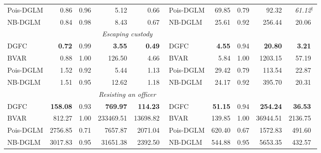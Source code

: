 \begin{tabular}{@{}lrrrr@{\qquad}lrrrr@{}}
Pois-DGLM & 0.86 & 0.96 & 5.12 & 0.66$^{\phantom{\dagger}}$ & Pois-DGLM & 69.85 & 0.79 & 92.32 & \textit{61.12}$^{\dagger}$ \\
NB-DGLM   & 0.84 & 0.98 & 8.43 & 0.67$^{\phantom{\dagger}}$ & NB-DGLM   & 25.61 & 0.92 & 256.44 & 20.06$^{\phantom{\dagger}}$ \\
\addlinespace
\multicolumn{5}{c}{\textit{Manslaughter}} & \multicolumn{5}{c}{\textit{Escaping custody}} \\
\cmidrule(r){1-5}\cmidrule(l){6-10}
DGFC      & \textbf{0.72} & 0.99 & \textbf{3.55} & \textbf{0.49}$^{\phantom{\dagger}}$ & DGFC      & \textbf{4.55} & 0.94 & \textbf{20.80} & \textbf{3.21}$^{\phantom{\dagger}}$ \\
BVAR      & 0.88 & 1.00 & 126.50 & 4.66$^{\phantom{\dagger}}$ & BVAR      & 5.84 & 1.00 & 1203.15 & 57.19$^{\phantom{\dagger}}$ \\
Pois-DGLM & 1.52 & 0.92 & 5.44 & 1.13$^{\phantom{\dagger}}$ & Pois-DGLM & 29.42 & 0.79 & 113.54 & 22.87$^{\phantom{\dagger}}$ \\
NB-DGLM   & 1.51 & 0.95 & 12.62 & 1.18$^{\phantom{\dagger}}$ & NB-DGLM   & 24.17 & 0.92 & 395.70 & 20.31$^{\phantom{\dagger}}$ \\
\addlinespace
\multicolumn{5}{c}{\textit{Non-domestic assault}} & \multicolumn{5}{c}{\textit{Resisting an officer}} \\
\cmidrule(r){1-5}\cmidrule(l){6-10}
DGFC      & \textbf{158.08} & 0.93 & \textbf{769.97} & \textbf{114.23}$^{\phantom{\dagger}}$ & DGFC      & \textbf{51.15} & 0.94 & \textbf{254.24} & \textbf{36.53}$^{\phantom{\dagger}}$ \\
BVAR      & 812.27 & 1.00 & 233469.51 & 13698.82$^{\phantom{\dagger}}$ & BVAR      & 139.85 & 1.00 & 36944.51 & 2136.75$^{\phantom{\dagger}}$ \\
Pois-DGLM & 2756.85 & 0.71 & 7657.87 & 2071.04$^{\phantom{\dagger}}$ & Pois-DGLM & 620.40 & 0.67 & 1572.83 & 491.60$^{\phantom{\dagger}}$ \\
NB-DGLM   & 3017.83 & 0.95 & 31651.38 & 2392.50$^{\phantom{\dagger}}$ & NB-DGLM   & 544.88 & 0.95 & 5653.35 & 432.57$^{\phantom{\dagger}}$ \\
\bottomrule
\end{tabular}
